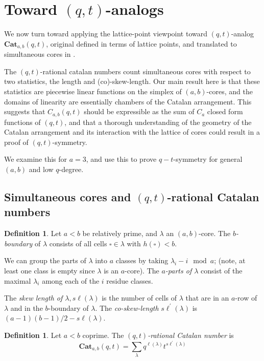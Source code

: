 \documentclass{amsart}[12pt]
\theoremstyle{definition}
\newtheorem{definition}[dummy]{Definition}
\newcommand{\Cat}{\mathbf{Cat}}
\newcommand{\sk}{s\ell}
\begin{document}
\section{Toward \texorpdfstring{$(q,t)$}{(q,t)}-analogs}

We now turn toward applying the lattice-point viewpoint toward $(q,t)$-analog $\Cat_{a,b}(q,t)$, original defined in terms of lattice points, and translated to simultaneous cores in \cite{AHJ}.  

The $(q,t)$-rational catalan numbers count simultaneous cores with respect to two statistics, the length and (co)-skew-length.   Our main result here is that these statistics are piecewise linear functions on the simplex of $(a,b)$-cores, and the domains of linearity are essentially chambers of the Catalan arrangement. This suggests that $C_{a,b}(q,t)$ should be expressible as the sum of $C_a$ closed form functions of $(q,t)$, and that a thorough understanding of the geometry of the Catalan arrangement and its interaction with the lattice of cores could result in a proof of $(q,t)$-symmetry.

We examine this for $a=3$, and use this to prove $q-t$-symmetry for general $(a,b)$ and low $q$-degree.

\subsection{Simultaneous cores and $(q,t)$-rational Catalan numbers}


\begin{definition}
Let $a<b$ be relatively prime, and $\lambda$ an $(a,b)$-core.  The                  \emph{$b$-boundary} of $\lambda$ consists of all cells $\square\in\lambda$ with $h(\square)<b$.

We can group the parts of $\lambda$ into $a$ classes by taking $\lambda_i-i\mod a$; (note, at least one class is empty since $\lambda$ is an $a$-core).  The \emph{$a$-parts of $\lambda$} consist of the maximal $\lambda_i$ among each of the $i$ residue classes.

The \emph{skew length of $\lambda, \sk(\lambda)$} is the number of cells of $\lambda$ that are in an $a$-row of $\lambda$ and in the $b$-boundary of $\lambda$. The \emph{co-skew-length} $\sk^\prime(\lambda)$ is $(a-1)(b-1)/2-\sk(\lambda)$.

\end{definition}


\begin{definition}
Let $a<b$ coprime.  The \emph{$(q,t)$-rational Catalan number} is
$$\Cat_{a,b}(q,t)=\sum_\lambda q^{\ell(\lambda)}t^{\sk^\prime(\lambda)}$$
\end{definition}
\end{document}
